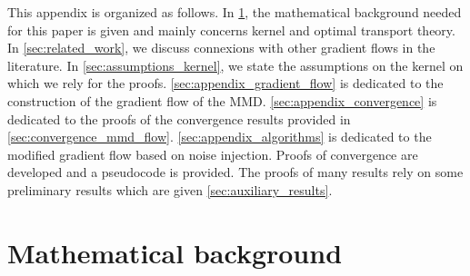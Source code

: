 

This appendix is organized as follows. In \cref{sec:appendix_math_background}, the mathematical background needed for this paper is given and mainly concerns kernel and optimal transport theory. In \cref{sec:related_work}, we discuss connexions with other gradient flows in the literature. In \cref{sec:assumptions_kernel}, we state the assumptions on the kernel on which we rely for the proofs. \cref{sec:appendix_gradient_flow} is dedicated to the construction of the gradient flow of the MMD. \cref{sec:appendix_convergence} is dedicated to the proofs of the convergence results provided in \cref{sec:convergence_mmd_flow}. \cref{sec:appendix_algorithms} is dedicated to the modified gradient flow based on noise injection. Proofs of convergence are developed and a pseudocode is provided. The proofs of many results rely on some preliminary results which are given \cref{sec:auxiliary_results}.


\section{Mathematical background}\label{sec:appendix_math_background}

